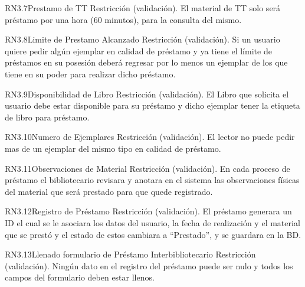 \begin{BussinesRule}{RN3.7}{Prestamo de TT} 
	\BRitem[Tipo:] Restricción (validación).
	\BRitem[Descripción:]El material de TT solo será préstamo por una hora (60 minutos), para la consulta del mismo.
\end{BussinesRule}

\begin{BussinesRule}{RN3.8}{Limite de Prestamo Alcanzado} 
	\BRitem[Tipo:] Restricción (validación).
	\BRitem[Descripción:]Si un usuario quiere pedir algún ejemplar en calidad de préstamo y ya tiene el límite de préstamos en su posesión deberá regresar por lo menos un ejemplar de los que tiene en su poder para realizar dicho préstamo.
\end{BussinesRule}

\begin{BussinesRule}{RN3.9}{Disponibilidad de Libro } 
	\BRitem[Tipo:] Restricción (validación).
	\BRitem[Descripción:]El Libro que solicita el usuario debe estar disponible para su préstamo y dicho ejemplar tener la etiqueta de libro para préstamo.
\end{BussinesRule}

\begin{BussinesRule}{RN3.10}{Numero de Ejemplares} 
	\BRitem[Tipo:] Restricción (validación).
	\BRitem[Descripción:]El lector no puede pedir mas de un ejemplar del mismo tipo en calidad de préstamo.
\end{BussinesRule}

\begin{BussinesRule}{RN3.11}{Observaciones de Material} 
	\BRitem[Tipo:] Restricción (validación).
	\BRitem[Descripción:]En cada proceso de préstamo el bibliotecario revisara y anotara en el sistema las observaciones físicas del material que será prestado para que quede registrado.
\end{BussinesRule}

\begin{BussinesRule}{RN3.12}{Registro de Préstamo} 
	\BRitem[Tipo:] Restricción (validación).
	\BRitem[Descripción:]El préstamo generara un ID el cual se le asociara los datos del usuario, la fecha de realización y el material que se prestó y el estado de estos cambiara a “Prestado”, y se guardara en la BD.
\end{BussinesRule}

\begin{BussinesRule}{RN3.13}{Llenado formulario de Préstamo Interbibliotecario} 
	\BRitem[Tipo:] Restricción (validación).
	\BRitem[Descripción:]Ningún dato en el registro del préstamo puede ser nulo y todos los campos del formulario deben estar llenos.
\end{BussinesRule}

